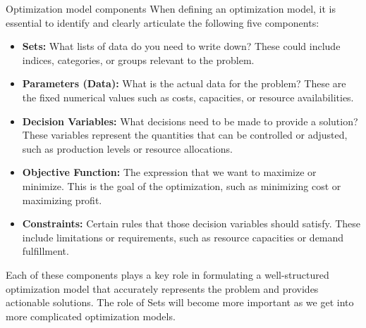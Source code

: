 \begin{definition}{Optimization model components}
When defining an optimization model, it is essential to identify and clearly articulate the following five components:

\begin{itemize}
    \item \textbf{Sets:} What lists of data do you need to write down? These could include indices, categories, or groups relevant to the problem.
    \item \textbf{Parameters (Data):} What is the actual data for the problem? These are the fixed numerical values such as costs, capacities, or resource availabilities.
    \item \textbf{Decision Variables:} What decisions need to be made to provide a solution? These variables represent the quantities that can be controlled or adjusted, such as production levels or resource allocations.
    \item \textbf{Objective Function:} The expression that we want to maximize or minimize. This is the goal of the optimization, such as minimizing cost or maximizing profit.
    \item \textbf{Constraints:} Certain rules that those decision variables should satisfy. These include limitations or requirements, such as resource capacities or demand fulfillment.
\end{itemize}

Each of these components plays a key role in formulating a well-structured optimization model that accurately represents the problem and provides actionable solutions.  The role of Sets will become more important as we get into more complicated optimization models.
\end{definition}

